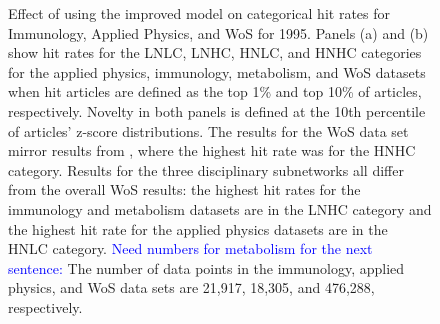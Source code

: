 \documentclass[NETN]{stjour}
\begin{document}
\begin{figure}
\caption{Effect of using the improved model on  categorical hit rates for Immunology, Applied Physics, and WoS for 1995. Panels (a) and (b) show hit rates for the LNLC, LNHC, HNLC, and HNHC categories for the applied physics, immunology, metabolism, and WoS datasets when hit articles are defined as the top 1\% and top 10\% of articles, respectively.  Novelty in both panels is defined at the 10th percentile of articles' z-score distributions. 
The results for the WoS data set mirror  results from \cite{uzzi_atypical_2013}, where the highest hit rate was for the HNHC category.  Results for the three disciplinary subnetworks all differ from the overall WoS results: the highest hit rates for the immunology and metabolism datasets  are in the LNHC category and
the highest hit rate for the applied physics datasets are in the HNLC category.  
\textcolor{blue}{Need numbers for metabolism for the next sentence:}
The number of data points in the immunology, applied physics, and WoS data sets are 21,917, 18,305, and 476,288, respectively.  
}
\label{fig:Fig2}
\end{figure}
\end{document}
